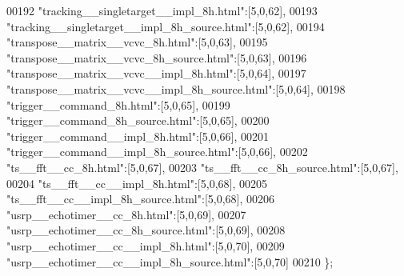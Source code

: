 \begin{DoxyCode}
00192 \textcolor{stringliteral}{"tracking\_\_singletarget\_\_impl\_8h.html"}:[5,0,62],
00193 \textcolor{stringliteral}{"tracking\_\_singletarget\_\_impl\_8h\_source.html"}:[5,0,62],
00194 \textcolor{stringliteral}{"transpose\_\_matrix\_\_vcvc\_8h.html"}:[5,0,63],
00195 \textcolor{stringliteral}{"transpose\_\_matrix\_\_vcvc\_8h\_source.html"}:[5,0,63],
00196 \textcolor{stringliteral}{"transpose\_\_matrix\_\_vcvc\_\_impl\_8h.html"}:[5,0,64],
00197 \textcolor{stringliteral}{"transpose\_\_matrix\_\_vcvc\_\_impl\_8h\_source.html"}:[5,0,64],
00198 \textcolor{stringliteral}{"trigger\_\_command\_8h.html"}:[5,0,65],
00199 \textcolor{stringliteral}{"trigger\_\_command\_8h\_source.html"}:[5,0,65],
00200 \textcolor{stringliteral}{"trigger\_\_command\_\_impl\_8h.html"}:[5,0,66],
00201 \textcolor{stringliteral}{"trigger\_\_command\_\_impl\_8h\_source.html"}:[5,0,66],
00202 \textcolor{stringliteral}{"ts\_\_fft\_\_cc\_8h.html"}:[5,0,67],
00203 \textcolor{stringliteral}{"ts\_\_fft\_\_cc\_8h\_source.html"}:[5,0,67],
00204 \textcolor{stringliteral}{"ts\_\_fft\_\_cc\_\_impl\_8h.html"}:[5,0,68],
00205 \textcolor{stringliteral}{"ts\_\_fft\_\_cc\_\_impl\_8h\_source.html"}:[5,0,68],
00206 \textcolor{stringliteral}{"usrp\_\_echotimer\_\_cc\_8h.html"}:[5,0,69],
00207 \textcolor{stringliteral}{"usrp\_\_echotimer\_\_cc\_8h\_source.html"}:[5,0,69],
00208 \textcolor{stringliteral}{"usrp\_\_echotimer\_\_cc\_\_impl\_8h.html"}:[5,0,70],
00209 \textcolor{stringliteral}{"usrp\_\_echotimer\_\_cc\_\_impl\_8h\_source.html"}:[5,0,70]
00210 \};
\end{DoxyCode}

